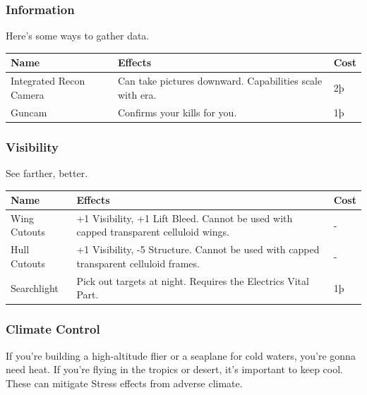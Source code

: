 \documentclass{article}
\begin{document}
\subsubsection{Information}
\label{_Information}

Here's some ways to gather data.

\begin{tabular}{|l|l|l|}
    \hline
    Name                    & Effects                                        & Cost \\\hline
    Integrated Recon Camera & Can take pictures downward. Capabilities scale
    with era.               & 2þ                                                    \\\hline
    Guncam                  & Confirms your kills for you.                   & 1þ   \\\hline
\end{tabular}

\subsubsection{Visibility}
\label{_Visibility}

See farther, better.

\begin{tabular}{|l|l|l|}
    \hline
    Name                          & Effects                                                  & Cost \\\hline
    Wing Cutouts                  & +1 Visibility, +1 Lift Bleed. Cannot be used with capped
    transparent celluloid wings.  & -                                                               \\\hline
    Hull Cutouts                  & +1 Visibility, -5 Structure. Cannot be used with capped
    transparent celluloid frames. & -                                                               \\\hline
    Searchlight                   & Pick out targets at night. Requires the Electrics Vital
    Part.                         & 1þ                                                              \\\hline
\end{tabular}

\subsubsection{Climate Control}
\label{_Climate_Control}

If you're building a high-altitude flier or a seaplane for cold waters,
you're gonna need heat. If you're flying in the tropics or desert, it's
important to keep cool. These can mitigate Stress effects from adverse
climate.
\end{document}

